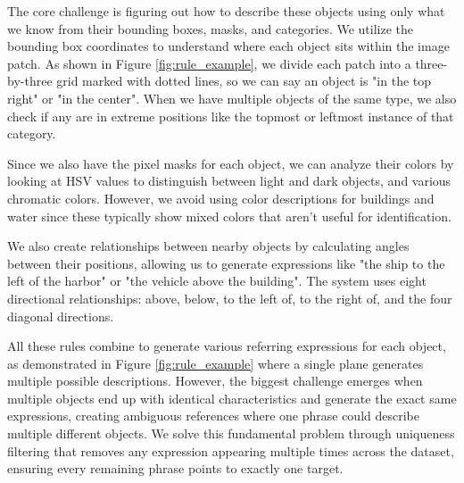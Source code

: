 The core challenge is figuring out how to describe these objects using only what we know from their bounding boxes, masks, and categories. We utilize the bounding box coordinates to understand where each object sits within the image patch. As shown in Figure \ref{fig:rule_example}, we divide each patch into a three-by-three grid marked with dotted lines, so we can say an object is "in the top right" or "in the center". When we have multiple objects of the same type, we also check if any are in extreme positions like the topmost or leftmost instance of that category.

Since we also have the pixel masks for each object, we can analyze their colors by looking at HSV values to distinguish between light and dark objects, and various chromatic colors. However, we avoid using color descriptions for buildings and water since these typically show mixed colors that aren't useful for identification.

We also create relationships between nearby objects by calculating angles between their positions, allowing us to generate expressions like "the ship to the left of the harbor" or "the vehicle above the building". The system uses eight directional relationships: above, below, to the left of, to the right of, and the four diagonal directions.

All these rules combine to generate various referring expressions for each object, as demonstrated in Figure \ref{fig:rule_example} where a single plane generates multiple possible descriptions. However, the biggest challenge emerges when multiple objects end up with identical characteristics and generate the exact same expressions, creating ambiguous references where one phrase could describe multiple different objects. We solve this fundamental problem through uniqueness filtering that removes any expression appearing multiple times across the dataset, ensuring every remaining phrase points to exactly one target.


